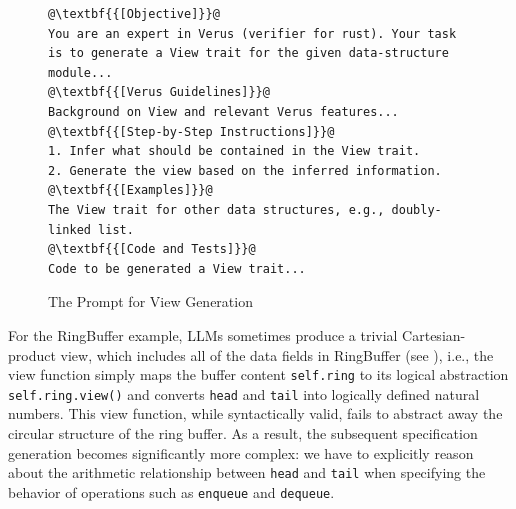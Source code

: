 

\begin{figure}[htbp]
\begin{lstlisting}[basicstyle=\fontsize{7pt}{7pt}\normalfont\ttfamily,frame=single,breaklines=true,escapechar=@,breakindent=0pt,xrightmargin=3em,xleftmargin=3em]
@\textbf{{[Objective]}}@
You are an expert in Verus (verifier for rust). Your task is to generate a View trait for the given data-structure module...
@\textbf{{[Verus Guidelines]}}@
Background on View and relevant Verus features...
@\textbf{{[Step-by-Step Instructions]}}@
1. Infer what should be contained in the View trait.
2. Generate the view based on the inferred information.
@\textbf{{[Examples]}}@
The View trait for other data structures, e.g., doubly-linked list.
@\textbf{{[Code and Tests]}}@
Code to be generated a View trait...
\end{lstlisting}
\caption{The Prompt for View Generation}
\label{fig:prompt-view-gen}
\end{figure}

\noindent
For the RingBuffer example, LLMs sometimes produce a trivial Cartesian-product view, which includes all of the data fields in RingBuffer (see ), i.e., the view function simply maps the buffer content \texttt{self.ring} to its logical abstraction \texttt{self.ring.view()} and converts \texttt{head} and \texttt{tail} into logically defined natural numbers. 
This view function, while syntactically valid, fails to abstract away the circular structure of the ring buffer. As a result, the subsequent specification generation becomes significantly more complex: we have to explicitly reason about the arithmetic relationship between \texttt{head} and \texttt{tail} when specifying the behavior of operations such as \texttt{enqueue} and \texttt{dequeue}. %

